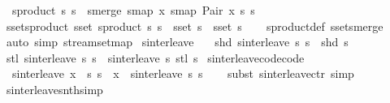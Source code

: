 \begin{isabellebody}
\ \ {\isachardoublequoteopen}sproduct\ s{}\ s{}\ {\isacharequal}\ smerge\ {\isacharparenleft}smap\ {\isacharparenleft}{\isasymlambda}x{\isachardot}\ smap\ {\isacharparenleft}Pair\ x{\isacharparenright}\ s{}{\isacharparenright}\ s{}{\isacharparenright}{\isachardoublequoteclose}\isanewline
\isanewline
{}\isamarkupfalse%
\ sset{\isacharunderscore}sproduct{\isacharcolon}\ {\isachardoublequoteopen}sset\ {\isacharparenleft}sproduct\ s{}\ s{}{\isacharparenright}\ {\isacharequal}\ sset\ s{}\ {\isasymtimes}\ sset\ s{}{\isachardoublequoteclose}\isanewline
%
\isadelimproof
\ \ %
\endisadelimproof
%
\isatagproof
{}\isamarkupfalse%
\ sproduct{\isacharunderscore}def\ sset{\isacharunderscore}smerge\ \isamarkupfalse%
\ {\isacharparenleft}auto\ simp{\isacharcolon}\ stream{\isachardot}set{\isacharunderscore}map{\isacharparenright}%
\endisatagproof
{\isafoldproof}%
%
\isadelimproof
%
\endisadelimproof
%
\isadelimdocument
%
\endisadelimdocument
%
\isatagdocument
%
\isamarkuptrue%
%
\endisatagdocument
{\isafolddocument}%
%
\isadelimdocument
%
\endisadelimdocument
{}\isamarkupfalse%
\ sinterleave\ \isanewline
\ \ {\isachardoublequoteopen}shd\ {\isacharparenleft}sinterleave\ s{}\ s{}{\isacharparenright}\ {\isacharequal}\ shd\ s{}{\isachardoublequoteclose}\isanewline
{\isacharbar}\ {\isachardoublequoteopen}stl\ {\isacharparenleft}sinterleave\ s{}\ s{}{\isacharparenright}\ {\isacharequal}\ sinterleave\ s{}\ {\isacharparenleft}stl\ s{}{\isacharparenright}{\isachardoublequoteclose}\isanewline
\isanewline
{}\isamarkupfalse%
\ sinterleave{\isacharunderscore}code{\isacharbrackleft}code{\isacharbrackright}{\isacharcolon}\isanewline
\ \ {\isachardoublequoteopen}sinterleave\ {\isacharparenleft}x\ {\isacharhash}{\isacharhash}\ s{}{\isacharparenright}\ s{}\ {\isacharequal}\ x\ {\isacharhash}{\isacharhash}\ sinterleave\ s{}\ s{}{\isachardoublequoteclose}\isanewline
%
\isadelimproof
\ \ %
\endisadelimproof
%
\isatagproof
{}\isamarkupfalse%
\ {\isacharparenleft}subst\ sinterleave{\isachardot}ctr{\isacharparenright}\ simp%
\endisatagproof
{\isafoldproof}%
%
\isadelimproof
\isanewline
%
\endisadelimproof
\isanewline
{}\isamarkupfalse%
\ sinterleave{\isacharunderscore}snth{\isacharbrackleft}simp{\isacharbrackright}{\isacharcolon}\isanewline

\end{isabellebody}
